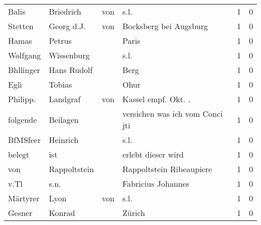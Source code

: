 \begin{center}
\begin{tiny}
\begin{longtabu}{llllrr}
                    Balis &                          Briedrich &         von &                                        s.l. &          1 &         0 \\
                  Stetten &                         Georg d.J. &         von &                      Bocksberg bei Augsburg &          1 &         0 \\
                    Hamas &                             Petrus &             &                                       Paris &          1 &         0 \\
                 Wolfgang &                         Wissenburg &             &                                        s.l. &          1 &         0 \\
                Bhllinger &                        Hans Rudolf &             &                                        Berg &          1 &         0 \\
                     Egli &                             Tobias &             &                                        Ohur &          1 &         0 \\
                 Philipp. &                           Landgraf &         von &                        Kassel empf. Okt. .  &          1 &         0 \\
                 folgende &                           Beilagen &             &             versichen was ich vom Conci jti &          1 &         0 \\
                 BfMSfeer &                           Heinrich &             &                                        s.l. &          1 &         0 \\
                   belegt &                                ist &             &                          erlebt dieser wird &          1 &         0 \\
                      von &                       Rappoltstein &             &                    Rappoltstein Ribeaupiere &          1 &         0 \\
                     v.Tl &                               s.n. &             &                          Fabricius Johannes &          1 &         0 \\
                 Märtyrer &                               Lyon &         von &                                        s.l. &          1 &         0 \\
                   Gesner &                             Konrad &             &                                      Zürich &          1 &         0 \\

\end{longtabu}
\end{tiny}
\end{center}
